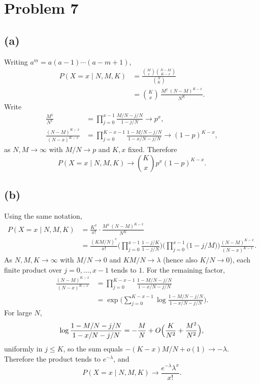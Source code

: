 \documentclass[11pt]{article}
\begin{document}
\section*{Problem 7}

\subsection*{(a)}

Writing $a^{\underline{m}}=a(a-1)\cdots(a-m+1)$,
\begin{align*}
P(X=x\mid N,M,K)
&=\frac{\binom{M}{x}\binom{N-M}{K-x}}{\binom{N}{K}}\\
&=\binom{K}{x}\,
\frac{M^{\underline{x}}\,(N-M)^{\underline{K-x}}}{N^{\underline{K}}}.
\end{align*}
Write
\begin{align*}
\frac{M^{\underline{x}}}{N^{\underline{x}}}
&=\prod_{j=0}^{x-1}\frac{M/N-j/N}{1-j/N}\to p^x,\\
\frac{(N-M)^{\underline{K-x}}}{(N-x)^{\underline{K-x}}}
&=\prod_{j=0}^{K-x-1}\frac{1-M/N-j/N}{1-x/N-j/N}\to(1-p)^{K-x},
\end{align*}
as $N,M\to\infty$ with $M/N\to p$ and $K,x$ fixed. Therefore
\[
P(X=x\mid N,M,K)\to\binom{K}{x}p^x(1-p)^{K-x}.
\]

\subsection*{(b)}

Using the same notation,
\begin{align*}
P(X=x\mid N,M,K)
&=\frac{K^{\underline{x}}}{x!}\cdot\frac{M^{\underline{x}}\,(N-M)^{\underline{K-x}}}{N^{\underline{K}}}\\
&=\frac{(KM/N)^x}{x!}
\Biggl(\prod_{j=0}^{x-1}\frac{1-j/K}{1-j/N}\Biggr)
\Biggl(\prod_{j=0}^{x-1}\bigl(1-j/M\bigr)\Biggr)
\frac{(N-M)^{\underline{K-x}}}{(N-x)^{\underline{K-x}}}.
\end{align*}
As $N,M,K\to\infty$ with $M/N\to 0$ and $KM/N\to\lambda$ (hence also $K/N\to 0$), each finite product over $j=0,\ldots,x-1$ tends to $1$. For the remaining factor,
\begin{align*}
\frac{(N-M)^{\underline{K-x}}}{(N-x)^{\underline{K-x}}}
&=\prod_{j=0}^{K-x-1}\frac{1-M/N-j/N}{1-x/N-j/N}\\
&=\exp\Biggl(\sum_{j=0}^{K-x-1}\log\frac{1-M/N-j/N}{1-x/N-j/N}\Biggr).
\end{align*}
For large $N$,
\[
\log\frac{1-M/N-j/N}{1-x/N-j/N}=-\frac{M}{N}+O\Bigl(\frac{K}{N^2}+\frac{M^2}{N^2}\Bigr),
\]
uniformly in $j\le K$, so the sum equals $-(K-x)M/N+o(1)\to-\lambda$. Therefore the product tends to $e^{-\lambda}$, and
\[
P(X=x\mid N,M,K)\to\frac{e^{-\lambda}\lambda^x}{x!}.
\]
\end{document}

